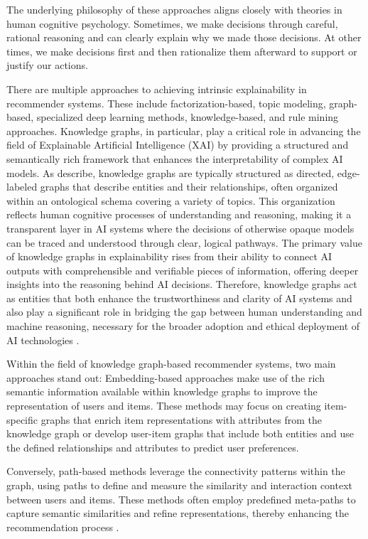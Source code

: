 The underlying philosophy of these approaches aligns closely with theories in human
cognitive psychology. Sometimes, we make decisions through careful, rational
reasoning and can clearly explain why we made those decisions. At other times,
we make decisions first and then rationalize them afterward to support or
justify our actions.

There are multiple approaches to achieving intrinsic explainability in
recommender systems. These include factorization-based, topic modeling, graph-based,
specialized deep learning methods, knowledge-based, and rule mining approaches. Knowledge
graphs, in particular, play a critical role in advancing the field of Explainable
Artificial Intelligence (XAI) by providing a structured and semantically rich framework
that enhances the interpretability of complex AI models. As \textcite{tiddi_knowledge_2022}
describe, knowledge graphs are typically structured as directed, edge-labeled graphs
that describe entities and their relationships, often organized within an
ontological schema covering a variety of topics. This organization reflects human
cognitive processes of understanding and reasoning, making it a transparent
layer in AI systems where the decisions of otherwise opaque models can be traced
and understood through clear, logical pathways. The primary value of knowledge
graphs in explainability rises from their ability to connect AI outputs with
comprehensible and verifiable pieces of information, offering deeper insights into
the reasoning behind AI decisions. Therefore, knowledge graphs act as entities that
both enhance the trustworthiness and clarity of AI systems and also play a significant
role in bridging the gap between human understanding and machine reasoning,
necessary for the broader adoption and ethical deployment of AI technologies
\parencite{tiddi_knowledge_2022}.

Within the field of knowledge graph-based recommender systems, two main approaches
stand out: Embedding-based approaches make use of the rich semantic information
available within knowledge graphs to improve the representation of users and
items. These methods may focus on creating item-specific graphs that enrich item
representations with attributes from the knowledge graph or develop user-item graphs
that include both entities and use the defined relationships and attributes to predict
user preferences.

Conversely, path-based methods leverage the connectivity patterns within the
graph, using paths to define and measure the similarity and interaction context between
users and items. These methods often employ predefined meta-paths to capture
semantic similarities and refine representations, thereby enhancing the recommendation
process \parencite{guo_survey_2020}.

